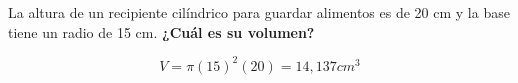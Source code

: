 La altura de un recipiente cilíndrico para guardar alimentos es de 20 cm y la base tiene un
radio de 15 cm. \textbf{¿Cuál es su volumen?}

\begin{solutionbox}{1.5cm}
    \[V = \pi (15)^2 (20) = 14,137 cm^3 \]
\end{solutionbox}
